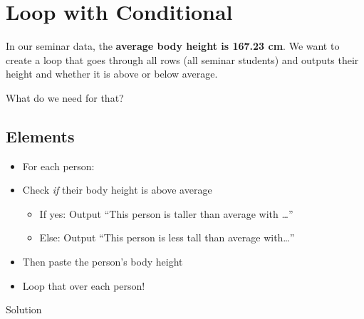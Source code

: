 \documentclass[
]{book}
\providecommand{\tightlist}{%
  \setlength{\itemsep}{0pt}\setlength{\parskip}{0pt}}
\begin{document}
\section{Loop with Conditional}\label{loop-with-conditional}

In our seminar data, the \textbf{average body height is 167.23 cm}. We want to create a loop that goes through all rows (all seminar students) and outputs their height and whether it is above or below average.

What do we need for that?

\subsection{Elements}\label{elements}

\begin{itemize}
\tightlist
\item
  For each person:
\item
  Check \emph{if} their body height is above average

  \begin{itemize}
  \tightlist
  \item
    If yes: Output ``This person is taller than average with \ldots{}''
  \item
    Else: Output ``This person is less tall than average with\ldots{}''
  \end{itemize}
\item
  Then paste the person's body height
\item
  Loop that over each person!
\end{itemize}

Solution
\end{document}
